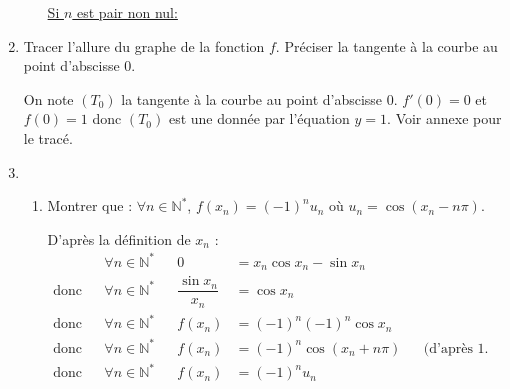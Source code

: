 \documentclass[a4paper,french,bookmarks]{article}
\begin{document}
\begin{enumerate}
\begin{enumerate}
\begin{tcolorbox}[colback=black!3,colframe=black!9,boxrule=.25pt,enhanced,arc is angular,arc=0pt]
       \underline{Si $n$ est pair non nul:}\\

        \end{tcolorbox}
    
\end{enumerate}
\item Tracer l'allure du graphe de la fonction $f$. Préciser la tangente à la courbe au point d'abscisse $0$.

\begin{enumerate}

\begin{tcolorbox}[colback=black!3,colframe=black!9,boxrule=.25pt,enhanced,arc is angular,arc=0pt]
            On note $\left(T_0\right)$ la tangente à la courbe au point d'abscisse $0$. $f'(0) = 0$ et $f(0) = 1$ donc $\left(T_0\right)$ est une donnée par l'équation $y = 1$. Voir annexe pour le tracé.
\end{tcolorbox}

\end{enumerate}
\item 
\begin{enumerate}
    \item Montrer que : \quad $\forall n \in \mathbb{N}^*$, $f(x_n) = (-1)^nu_n$ où $u_n = \cos(x_n - n\pi)$.
    \begin{tcolorbox}[colback=black!3,colframe=black!9,boxrule=.25pt,enhanced,arc is angular,arc=0pt]
    D'après la définition de $x_n$ :
    \begin{align*}
        && \forall n \in \mathbb{N}^* && 0 &= x_n\cos x_n - \sin x_n&&\\
    \text{donc} && \forall n \in \mathbb{N}^* && \dfrac{\sin x_n}{x_n} &= \cos x_n\\
    \text{donc} && \forall n \in \mathbb{N}^* && f(x_n) &= (-1)^n(-1)^n\cos x_n\\
    \text{donc} && \forall n \in \mathbb{N}^* && f(x_n) &= (-1)^n\cos(x_n + n\pi) && \text{(d'après 1. (a))}\\
        \text{donc} && \forall n \in \mathbb{N}^* && f(x_n) &= (-1)^nu_n
    \end{align*}
    \end{tcolorbox}
    

\end{enumerate}
\end{enumerate}
\end{document}
